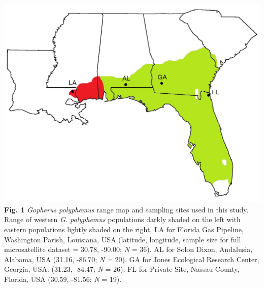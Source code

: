 \documentclass[english]{article}\usepackage[]{graphicx}\usepackage[]{color}
\begin{document}
\pagebreak{}
\noindent
\includegraphics [scale=1.0]{range_map}
\noindent
\textbf{Fig. 1} \textit{Gopherus polyphemus} range map and sampling sites used in this study. Range of western \textit{G. polyphemus} populations darkly shaded on the left with eastern populations lightly shaded on the right. LA for Florida Gas Pipeline, Washington Parish, Louisiana, USA (latitude, longitude, sample size for full microsatellite dataset = 30.78, -90.00; \textit{N} = 36). AL for Solon Dixon, Andalusia, Alabama, USA (31.16, -86.70; \textit{N} = 20). GA for Jones Ecological Research Center, Georgia, USA. (31.23, -84.47; \textit{N} = 26). FL for Private Site, Nassau County, Florida, USA (30.59, -81.56; \textit{N} = 19).\\
\end{document}
